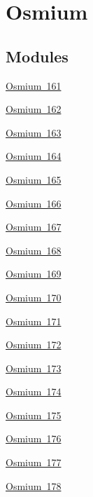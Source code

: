 \hypertarget{group___isotope_const-_osmium}{}\section{Osmium}
\label{group___isotope_const-_osmium}
\subsection*{Modules}
\begin{DoxyCompactItemize}
\item 
\mbox{\hyperlink{group___isotope_const-_osmium-_os161}{Osmium 161}}
\item 
\mbox{\hyperlink{group___isotope_const-_osmium-_os162}{Osmium 162}}
\item 
\mbox{\hyperlink{group___isotope_const-_osmium-_os163}{Osmium 163}}
\item 
\mbox{\hyperlink{group___isotope_const-_osmium-_os164}{Osmium 164}}
\item 
\mbox{\hyperlink{group___isotope_const-_osmium-_os165}{Osmium 165}}
\item 
\mbox{\hyperlink{group___isotope_const-_osmium-_os166}{Osmium 166}}
\item 
\mbox{\hyperlink{group___isotope_const-_osmium-_os167}{Osmium 167}}
\item 
\mbox{\hyperlink{group___isotope_const-_osmium-_os168}{Osmium 168}}
\item 
\mbox{\hyperlink{group___isotope_const-_osmium-_os169}{Osmium 169}}
\item 
\mbox{\hyperlink{group___isotope_const-_osmium-_os170}{Osmium 170}}
\item 
\mbox{\hyperlink{group___isotope_const-_osmium-_os171}{Osmium 171}}
\item 
\mbox{\hyperlink{group___isotope_const-_osmium-_os172}{Osmium 172}}
\item 
\mbox{\hyperlink{group___isotope_const-_osmium-_os173}{Osmium 173}}
\item 
\mbox{\hyperlink{group___isotope_const-_osmium-_os174}{Osmium 174}}
\item 
\mbox{\hyperlink{group___isotope_const-_osmium-_os175}{Osmium 175}}
\item 
\mbox{\hyperlink{group___isotope_const-_osmium-_os176}{Osmium 176}}
\item 
\mbox{\hyperlink{group___isotope_const-_osmium-_os177}{Osmium 177}}
\item 
\mbox{\hyperlink{group___isotope_const-_osmium-_os178}{Osmium 178}}

\end{DoxyCompactItemize}

